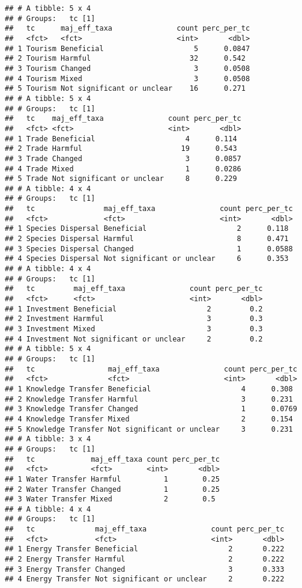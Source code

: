 \documentclass[
]{article}
\begin{document}
\begin{verbatim}
## # A tibble: 5 x 4
## # Groups:   tc [1]
##   tc      maj_eff_taxa               count perc_per_tc
##   <fct>   <fct>                      <int>       <dbl>
## 1 Tourism Beneficial                     5      0.0847
## 2 Tourism Harmful                       32      0.542 
## 3 Tourism Changed                        3      0.0508
## 4 Tourism Mixed                          3      0.0508
## 5 Tourism Not significant or unclear    16      0.271 
## # A tibble: 5 x 4
## # Groups:   tc [1]
##   tc    maj_eff_taxa               count perc_per_tc
##   <fct> <fct>                      <int>       <dbl>
## 1 Trade Beneficial                     4      0.114 
## 2 Trade Harmful                       19      0.543 
## 3 Trade Changed                        3      0.0857
## 4 Trade Mixed                          1      0.0286
## 5 Trade Not significant or unclear     8      0.229 
## # A tibble: 4 x 4
## # Groups:   tc [1]
##   tc                maj_eff_taxa               count perc_per_tc
##   <fct>             <fct>                      <int>       <dbl>
## 1 Species Dispersal Beneficial                     2      0.118 
## 2 Species Dispersal Harmful                        8      0.471 
## 3 Species Dispersal Changed                        1      0.0588
## 4 Species Dispersal Not significant or unclear     6      0.353 
## # A tibble: 4 x 4
## # Groups:   tc [1]
##   tc         maj_eff_taxa               count perc_per_tc
##   <fct>      <fct>                      <int>       <dbl>
## 1 Investment Beneficial                     2         0.2
## 2 Investment Harmful                        3         0.3
## 3 Investment Mixed                          3         0.3
## 4 Investment Not significant or unclear     2         0.2
## # A tibble: 5 x 4
## # Groups:   tc [1]
##   tc                 maj_eff_taxa               count perc_per_tc
##   <fct>              <fct>                      <int>       <dbl>
## 1 Knowledge Transfer Beneficial                     4      0.308 
## 2 Knowledge Transfer Harmful                        3      0.231 
## 3 Knowledge Transfer Changed                        1      0.0769
## 4 Knowledge Transfer Mixed                          2      0.154 
## 5 Knowledge Transfer Not significant or unclear     3      0.231 
## # A tibble: 3 x 4
## # Groups:   tc [1]
##   tc             maj_eff_taxa count perc_per_tc
##   <fct>          <fct>        <int>       <dbl>
## 1 Water Transfer Harmful          1        0.25
## 2 Water Transfer Changed          1        0.25
## 3 Water Transfer Mixed            2        0.5 
## # A tibble: 4 x 4
## # Groups:   tc [1]
##   tc              maj_eff_taxa               count perc_per_tc
##   <fct>           <fct>                      <int>       <dbl>
## 1 Energy Transfer Beneficial                     2       0.222
## 2 Energy Transfer Harmful                        2       0.222
## 3 Energy Transfer Changed                        3       0.333
## 4 Energy Transfer Not significant or unclear     2       0.222
\end{verbatim}
\end{document}
